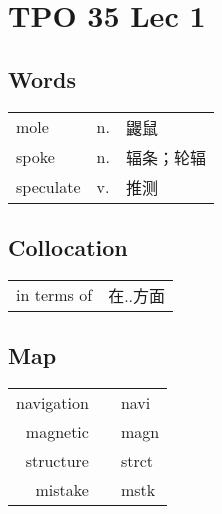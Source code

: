 \section{TPO 35 Lec 1}

\subsection{Words}

\begin{tabular}{lll}
    mole      & n. & 鼹鼠    \\
    spoke     & n. & 辐条；轮辐 \\
    speculate & v. & 推测    \\
\end{tabular}

\subsection{Collocation}

\begin{tabular}{ll}
    in terms of & 在..方面 \\
\end{tabular}

\subsection{Map}

\begin{tabular}{rc@{\quad$\to$\quad}l}
    navigation &  & navi  \\
    magnetic   &  & magn  \\
    structure  &  & strct \\
    mistake    &  & mstk  \\
\end{tabular}
